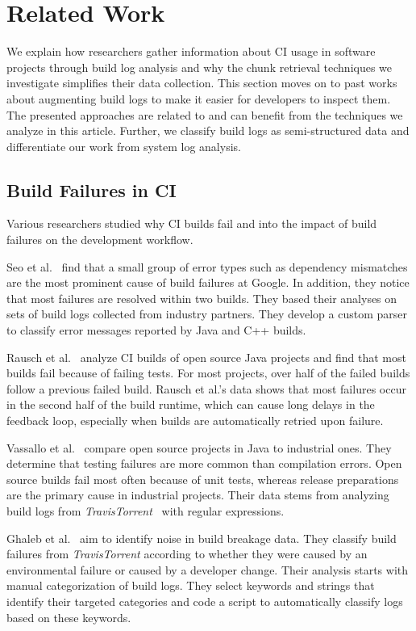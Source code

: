 
\section{Related Work}
\label{sec:rw}
We explain how researchers gather information about CI usage in software projects
through build log analysis and why the chunk retrieval techniques we investigate
simplifies their data collection.
This section moves on to past works about augmenting build logs to make it easier
for developers to inspect them.
The presented approaches are related to and can benefit from the techniques we
analyze in this article.
Further, we classify build logs as semi-structured data and differentiate our
work from system log analysis.

\subsection{Build Failures in CI}
Various researchers studied why CI builds fail and into the impact of
build failures on the development workflow.

Seo et al.~\cite{seo2014programmers} find that a small group of error
types such as dependency mismatches are the most prominent cause of
build failures at Google. In addition, they notice that most failures
are resolved within two builds. They based their analyses on sets of
build logs collected from industry partners. They develop a custom
parser to classify error messages reported by Java and C++ builds.

Rausch et al.~\cite{rausch2017empirical} analyze CI builds of open
source Java projects and find that most builds fail because of failing
tests. For most projects, over half of the failed builds follow a
previous failed build. Rausch et al.'s data shows that most failures
occur in the second half of the build runtime, which can cause long
delays in the feedback loop, especially when builds are automatically
retried upon failure.

Vassallo et al.~\cite{vassallo2017a-tale} compare open source projects
in Java to industrial ones. They determine that testing failures are
more common than compilation errors. Open source builds fail most
often because of unit tests, whereas release preparations are the
primary cause in industrial projects. Their data stems from analyzing
build logs from \emph{TravisTorrent}~\cite{beller2017travistorrent}
with regular expressions.

Ghaleb et al.~\cite{ghaleb2019studying} aim to identify noise in build
breakage data. They classify build failures from \emph{TravisTorrent}
according to whether they were caused by an environmental failure or
caused by a developer change. Their analysis starts with manual
categorization of build logs. They select keywords and strings that
identify their targeted categories and code a script to automatically
classify logs based on these keywords.

